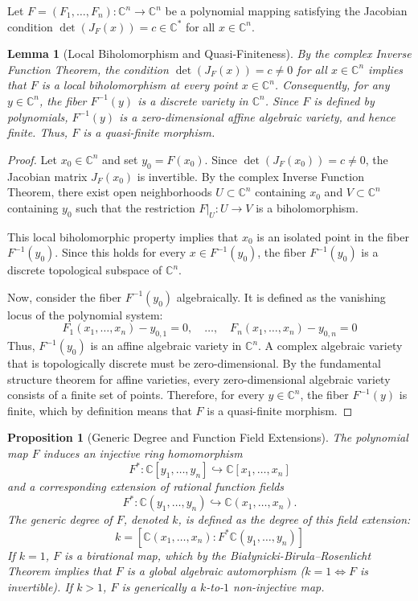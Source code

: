 \documentclass[11pt,reqno]{amsart}
\newtheorem{lemma}[theorem]{Lemma}
\newtheorem{proposition}[theorem]{Proposition}
\theoremstyle{definition}
\begin{document}
Let $F = (F_1, \dots, F_n): \mathbb{C}^n \to \mathbb{C}^n$ be a polynomial mapping satisfying the Jacobian condition $\det(J_F(x)) = c \in \mathbb{C}^*$ for all $x \in \mathbb{C}^n$.


\begin{lemma}[Local Biholomorphism and Quasi-Finiteness]
By the complex Inverse Function Theorem, the condition $\det(J_F(x)) = c \neq 0$ for all $x \in \mathbb{C}^n$ implies that $F$ is a local biholomorphism at every point $x \in \mathbb{C}^n$. Consequently, for any $y \in \mathbb{C}^n$, the fiber $F^{-1}(y)$ is a discrete variety in $\mathbb{C}^n$. Since $F$ is defined by polynomials, $F^{-1}(y)$ is a zero-dimensional affine algebraic variety, and hence finite. Thus, $F$ is a quasi-finite morphism.
\end{lemma}

\begin{proof}
Let $x_0 \in \mathbb{C}^n$ and set $y_0 = F(x_0)$. Since $\det(J_F(x_0)) = c \neq 0$, the Jacobian matrix $J_F(x_0)$ is invertible. By the complex Inverse Function Theorem, there exist open neighborhoods $U \subset \mathbb{C}^n$ containing $x_0$ and $V \subset \mathbb{C}^n$ containing $y_0$ such that the restriction $F|_U: U \to V$ is a biholomorphism. 

This local biholomorphic property implies that $x_0$ is an isolated point in the fiber $F^{-1}(y_0)$. Since this holds for every $x \in F^{-1}(y_0)$, the fiber $F^{-1}(y_0)$ is a discrete topological subspace of $\mathbb{C}^n$.

Now, consider the fiber $F^{-1}(y_0)$ algebraically. It is defined as the vanishing locus of the polynomial system:
$$F_1(x_1, \dots, x_n) - y_{0,1} = 0, \quad \dots, \quad F_n(x_1, \dots, x_n) - y_{0,n} = 0$$
Thus, $F^{-1}(y_0)$ is an affine algebraic variety in $\mathbb{C}^n$. A complex algebraic variety that is topologically discrete must be zero-dimensional. By the fundamental structure theorem for affine varieties, every zero-dimensional algebraic variety consists of a finite set of points. Therefore, for every $y \in \mathbb{C}^n$, the fiber $F^{-1}(y)$ is finite, which by definition means that $F$ is a quasi-finite morphism.
\end{proof}




\begin{proposition}[Generic Degree and Function Field Extensions]
The polynomial map $F$ induces an injective ring homomorphism 
$$F^*: \mathbb{C}[y_1, \dots, y_n] \hookrightarrow \mathbb{C}[x_1, \dots, x_n]$$ 
and a corresponding extension of rational function fields 
$$F^*: \mathbb{C}(y_1, \dots, y_n) \hookrightarrow \mathbb{C}(x_1, \dots, x_n).$$ 
The generic degree of $F$, denoted $k$, is defined as the degree of this field extension:
$$k = [\mathbb{C}(x_1, \dots, x_n) : F^*\mathbb{C}(y_1, \dots, y_n)]$$
If $k = 1$, $F$ is a birational map, which by the Białynicki-Birula--Rosenlicht Theorem implies that $F$ is a global algebraic automorphism ($k=1 \iff F$ is invertible). If $k > 1$, $F$ is generically a $k$-to-$1$ non-injective map.
\end{proposition}
\end{document}
